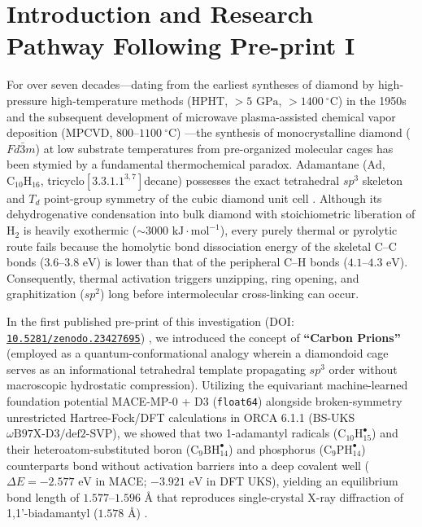\documentclass[10pt,twocolumn,a4paper]{article}
\begin{document}
\section{Introduction and Research Pathway Following Pre-print I}

For over seven decades---dating from the earliest syntheses of diamond by high-pressure high-temperature methods (HPHT, $>5\text{ GPa}$, $>1400\ ^\circ\text{C}$) in the 1950s and the subsequent development of microwave plasma-assisted chemical vapor deposition (MPCVD, $800\text{--}1100\ ^\circ\text{C}$) \cite{Asmussen2002,Silva2009}---the synthesis of monocrystalline diamond ($Fd\bar{3}m$) at low substrate temperatures from pre-organized molecular cages has been stymied by a fundamental thermochemical paradox. Adamantane ($\text{Ad}$, $\text{C}_{10}\text{H}_{16}$, tricyclo$[3.3.1.1^{3,7}]$decane) possesses the exact tetrahedral $sp^3$ skeleton and $T_d$ point-group symmetry of the cubic diamond unit cell \cite{Dahl2003}. Although its dehydrogenative condensation into bulk diamond with stoichiometric liberation of $\text{H}_2$ is heavily exothermic ($\sim 3000\text{ kJ}\cdot\text{mol}^{-1}$), every purely thermal or pyrolytic route fails because the homolytic bond dissociation energy of the skeletal $\text{C--C}$ bonds ($3.6\text{--}3.8\text{ eV}$) is lower than that of the peripheral $\text{C--H}$ bonds ($4.1\text{--}4.3\text{ eV}$). Consequently, thermal activation triggers unzipping, ring opening, and graphitization ($sp^2$) long before intermolecular cross-linking can occur.

In the first published pre-print of this investigation (DOI: \href{https://doi.org/10.5281/zenodo.23427695}{\texttt{10.5281/zenodo.23427695}}) \cite{RodriguezGarcia2026_Part1}, we introduced the concept of \textbf{``Carbon Prions''} (employed as a quantum-conformational analogy wherein a diamondoid cage serves as an informational tetrahedral template propagating $sp^3$ order without macroscopic hydrostatic compression). Utilizing the equivariant machine-learned foundation potential MACE-MP-0 + D3 (\texttt{float64}) alongside broken-symmetry unrestricted Hartree-Fock/DFT calculations in ORCA 6.1.1 (BS-UKS $\omega\text{B97X-D3/def2-SVP}$), we showed that two 1-adamantyl radicals ($\text{C}_{10}\text{H}_{15}^\bullet$) and their heteroatom-substituted boron ($\text{C}_9\text{BH}_{14}^\bullet$) and phosphorus ($\text{C}_9\text{PH}_{14}^\bullet$) counterparts bond without activation barriers into a deep covalent well ($\Delta E = -2.577\text{ eV}$ in MACE; $-3.921\text{ eV}$ in DFT UKS), yielding an equilibrium bond length of $1.577\text{--}1.596\text{ \AA}$ that reproduces single-crystal X-ray diffraction of 1,1'-biadamantyl ($1.578\text{ \AA}$) \cite{Alden1968}.
\end{document}
